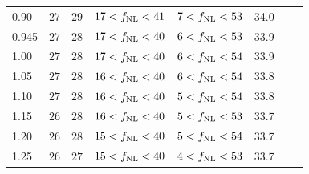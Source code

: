 \begin{table}
{\begin{tabular}{llllllll}
0.90                                    & $    27$& $    29$& $    17<f_{\rm NL}<    41$& $     7<f_{\rm NL}<    53$ &   34.0\\
0.945                                   & $    27$& $    28$& $    17<f_{\rm NL}<    40$& $     6<f_{\rm NL}<    53$ &   33.9\\
1.00                                    & $    27$& $    28$& $    17<f_{\rm NL}<    40$& $     6<f_{\rm NL}<    54$ &   33.9\\
1.05                                    & $    27$& $    28$& $    16<f_{\rm NL}<    40$& $     6<f_{\rm NL}<    54$ &   33.8\\
1.10                                    & $    27$& $    28$& $    16<f_{\rm NL}<    40$& $     5<f_{\rm NL}<    54$ &   33.8\\
1.15                                    & $    26$& $    28$& $    16<f_{\rm NL}<    40$& $     5<f_{\rm NL}<    53$ &   33.7\\
1.20                                    & $    26$& $    28$& $    15<f_{\rm NL}<    40$& $     5<f_{\rm NL}<    54$ &   33.7\\
1.25                                    & $    26$& $    27$& $    15<f_{\rm NL}<    40$& $     4<f_{\rm NL}<    53$ &   33.7\\
   \hline
    \end{tabular}}
\end{table}